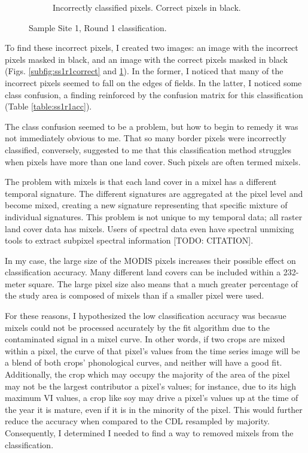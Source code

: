 \begin{figure}
\begin{subfigure}[b]{.45\textwidth}
    \caption{Incorrectly classified pixels. Correct pixels in black.}
    \label{subfig:ss1r1incorrect}
  \end{subfigure}
  \caption{Sample Site 1, Round 1 classification.}
  \label{fig:ss1r1class}
\end{figure}

To find these incorrect pixels, I created two images: an image with the incorrect pixels masked in black, and an image with the correct pixels masked in black (Figs. \ref{subfig:ss1r1correct} and \ref{subfig:ss1r1incorrect}). In the former, I noticed that many of the incorrect pixels seemed to fall on the edges of fields. In the latter, I noticed some class confusion, a finding reinforced by the confusion matrix for this classification (Table \ref{table:ss1r1acc}).

The class confusion seemed to be a problem, but how to begin to remedy it was not immediately obvious to me. That so many border pixels were incorrectly classified, conversely, suggested to me that this classification method struggles when pixels have more than one land cover. Such pixels are often termed mixels.

The problem with mixels is that each land cover in a mixel has a different temporal signature. The different signatures are aggregated at the pixel level and become mixed, creating a new signature representing that specific mixture of individual signatures. This problem is not unique to my temporal data; all raster land cover data has mixels. Users of spectral data even have spectral unmixing tools to extract subpixel spectral information [TODO: CITATION].

In my case, the large size of the MODIS pixels increases their possible effect on classification accuracy. Many different land covers can be included within a 232-meter square. The large pixel size also means that a much greater percentage of the study area is composed of mixels than if a smaller pixel were used.

For these reasons, I hypothesized the low classification accuracy was becasue mixels could not be processed accurately by the fit algorithm due to the contaminated signal in a mixel curve. In other words, if two crops are mixed within a pixel, the curve of that pixel’s values from the time series image will be a blend of both crops’ phonological curves, and neither will have a good fit. Additionally, the crop which may occupy the majority of the area of the pixel may not be the largest contributor a pixel’s values; for instance, due to its high maximum VI values, a crop like soy may drive a pixel’s values up at the time of the year it is mature, even if it is in the minority of the pixel. This would further reduce the accuracy when compared to the CDL resampled by majority. Consequently, I determined I needed to find a way to removed mixels from the classification.

